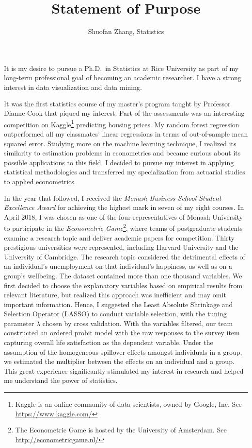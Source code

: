 \documentclass[12pt,]{article}
\title{Statement of Purpose}
\author{Shuofan Zhang, Statistics}
\date{}
\let\rmarkdownfootnote\footnote%
\def\footnote{\protect\rmarkdownfootnote}
\begin{document}
\maketitle


It is my desire to pursue a Ph.D.~in Statistics at Rice University as
part of my long-term professional goal of becoming an academic
researcher. I have a strong interest in data visualization and data
mining.

It was the first statistics course of my master's program taught by
Professor Dianne Cook that piqued my interest. Part of the assessments
was an interesting competition on Kaggle\footnote{Kaggle is an online
  community of data scientists, owned by Google, Inc. See
  \url{https://www.kaggle.com/}} predicting housing prices. My random
forest regression outperformed all my classmates' linear regressions in
terms of out-of-sample mean squared error. Studying more on the machine
learning technique, I realized its similarity to estimation problems in
econometrics and became curious about its possible applications to this
field. I decided to pursue my interest in applying statistical
methodologies and transferred my specialization from actuarial studies
to applied econometrics.

In the year that followed, I received the \emph{Monash Business School
Student Excellence Award} for achieving the highest mark in seven of my
eight courses. In April 2018, I was chosen as one of the four
representatives of Monash University to participate in the
\emph{Econometric Game}\footnote{The Econometric Game is hosted by the
  University of Amsterdam. See \url{http://econometricgame.nl/}}, where
teams of postgraduate students examine a research topic and deliver
academic papers for competition. Thirty prestigious universities were
represented, including Harvard University and the University of
Cambridge. The research topic considered the detrimental effects of an
individual's unemployment on that individual's happiness, as well as on
a group's wellbeing. The dataset contained more than one thousand
variables. We first decided to choose the explanatory variables based on
empirical results from relevant literature, but realized this approach
was inefficient and may omit important information. Hence, I suggested
the Least Absolute Shrinkage and Selection Operator (LASSO) to conduct
variable selection, with the tuning parameter \(\lambda\) chosen by
cross validation. With the variables filtered, our team constructed an
ordered probit model with the raw responses to the survey item capturing
overall life satisfaction as the dependent variable. Under the
assumption of the homogeneous spillover effects amongst individuals in a
group, we estimated the multiplier between the effects on an individual
and a group. This great experience significantly stimulated my interest
in research and helped me understand the power of statistics.
\end{document}
